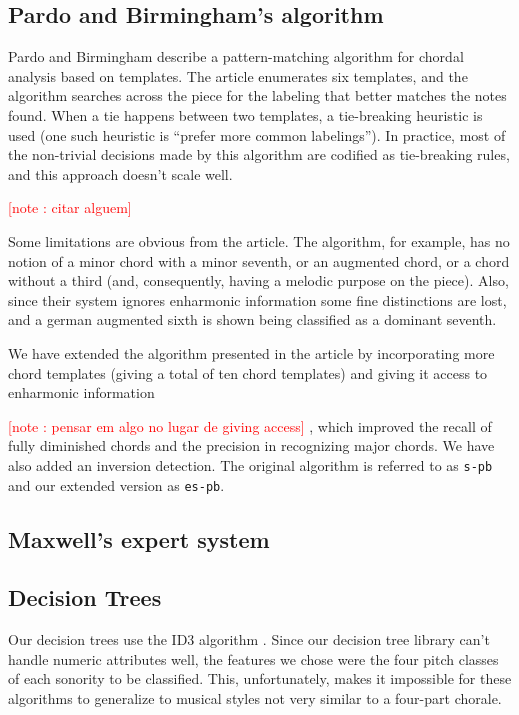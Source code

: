 \documentclass{article}
\newcounter{notecounter}
\newcommand{\note}[1]{
  \addtocounter{notecounter}{1}
  \textcolor{red}{[note \arabic{notecounter}: #1]}
}
\begin{document}
\subsection{Pardo and Birmingham's algorithm}
\label{sec:pardo}


Pardo and Birmingham \cite{pardo.ea:algorithms} describe a
pattern-matching algorithm for chordal analysis based on templates.
The article enumerates six templates, and the algorithm searches
across the piece for the labeling that better matches the notes found.
When a tie happens between two templates, a tie-breaking heuristic is
used (one such heuristic is ``prefer more common labelings''). In
practice, most of the non-trivial decisions made by this algorithm are
codified as tie-breaking rules, and this approach doesn't scale well.
\note{citar alguem}

Some limitations are obvious from the article. The algorithm, for
example, has no notion of a minor chord with a minor seventh, or an
augmented chord, or a chord without a third (and, consequently, having
a melodic purpose on the piece). Also, since their system ignores
enharmonic information some fine distinctions are lost, and a german
augmented sixth is shown being classified as a dominant seventh.

We have extended the algorithm presented in the article by
incorporating more chord templates (giving a total of ten chord
templates) and giving it access to enharmonic information \note{pensar
  em algo no lugar de giving access}, which improved the recall of
fully diminished chords and the precision in recognizing major chords.
We have also added an inversion detection. The original algorithm is
referred to as \texttt{s-pb} and our extended version as
\texttt{es-pb}.

\subsection{Maxwell's expert system}
\label{sec:maxwell}


\subsection{Decision Trees}
\label{sec:tree}

Our decision trees use the ID3 algorithm
\cite{mitchell:machine}. Since our decision tree library can't handle
numeric attributes well, the features we chose were the four pitch
classes of each sonority to be classified. This, unfortunately,
makes it impossible for these algorithms to generalize to musical
styles not very similar to a four-part chorale.
\end{document}

